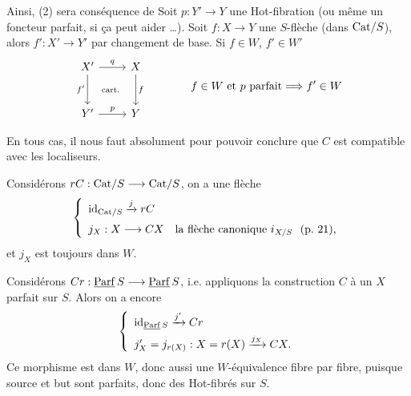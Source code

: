 Ainsi, (2) sera conséquence de  Soit $p : Y' \longrightarrow Y$ une Hot-fibration (ou même un foncteur parfait, si ça peut aider \dots). Soit $f : X \longrightarrow Y$ une $S$-flèche (dans $\mathrm{Cat}/S$), alors $f' : X' \longrightarrow Y'$ par changement de base. Si $f \in W$, $f' \in W'$
\[
\begin{tikzcd}[row sep=large]
X' \arrow[r, "q"] \arrow[d, "{f'}"'] \arrow[dr, phantom, "\scriptstyle\text{cart.}"] & X \arrow[d, "f"] \\
Y' \arrow[r, "p"] & Y
\end{tikzcd}
\qquad\qquad
f \in W \text{ et } p \text{ parfait} \Longrightarrow f' \in W
\]

En tous cas, il nous faut absolument  pour pouvoir conclure que $C$ est compatible avec les localiseurs.

Considérons $rC : \mathrm{Cat}/S \longrightarrow \mathrm{Cat}/S$, on a une flèche
\[
\left\{
\begin{array}{l}
\mathrm{id}_{\mathrm{Cat}/S} \xrightarrow{j} rC \\[1.5ex]
j_X : X \longrightarrow CX \quad \text{la flèche canonique } i_{X/S}\  \text{ (p.~21),}
\end{array}
\right.
\]
et $j_X$ est toujours dans $W$.

Considérons $Cr : \underline{\mathrm{Parf}}\,S \longrightarrow \underline{\mathrm{Parf}}\,S$, i.e. appliquons la construction $C$ à un $X$ parfait sur $S$. Alors on a encore
\[
\left\{
\begin{array}{l}
\mathrm{id}_{\underline{\mathrm{Parf}}\,S} \xrightarrow{j'} Cr \\[1ex]
j'_X = j_{r(X)} : X = r(X) \xrightarrow{j_X} CX.
\end{array}
\right.
\]
Ce morphisme est dans $W$, donc aussi une $W$-équivalence fibre par fibre, puisque source et but sont parfaits, donc des Hot-fibrés sur $S$.

